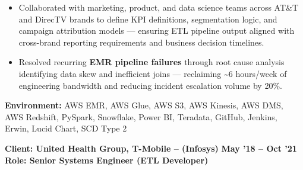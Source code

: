 \documentclass[a4paper,10pt]{article}
\begin{document}
\begin{itemize}
    \item Collaborated with marketing, product, and data science teams across AT\&T and DirecTV brands to define KPI definitions, segmentation logic, and campaign attribution models — ensuring ETL pipeline output aligned with cross-brand reporting requirements and business decision timelines.
    \item Resolved recurring \textbf{EMR pipeline failures} through root cause analysis identifying data skew and inefficient joins — reclaiming \textasciitilde 6 hours/week of engineering bandwidth and reducing incident escalation volume by 20\%.
\end{itemize}

\textbf{Environment:} AWS EMR, AWS Glue, AWS S3, AWS Kinesis, AWS DMS, AWS Redshift, PySpark, Snowflake, Power BI, Teradata, GitHub, Jenkins, Erwin, Lucid Chart, SCD Type 2

\vspace{1em}

\noindent \textbf{Client: United Health Group, T-Mobile – (Infosys)} \hfill \textbf{May '18 – Oct '21} \\
\textbf{Role: Senior Systems Engineer (ETL Developer)}
\end{document}
